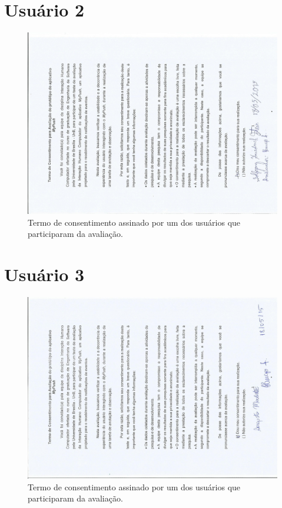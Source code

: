 \begin{anexosenv}
   \section*{Usuário 2}
    \begin{figure}[!htbp]
      \centering
      \includegraphics[scale=0.6, angle=-90]{editaveis/figuras/wolfgang}
      \caption{Termo de consentimento assinado por um dos usuários que participaram da avaliação.}
      \label{termo_consentimento_1}
    \end{figure}
    
       \section*{Usuário 3}
    \begin{figure}[!htbp]
      \centering
      \includegraphics[scale=0.6, angle=-90]{editaveis/figuras/modesto}
      \caption{Termo de consentimento assinado por um dos usuários que participaram da avaliação.}
      \label{termo_consentimento_1}
    \end{figure}
    

\end{anexosenv}
